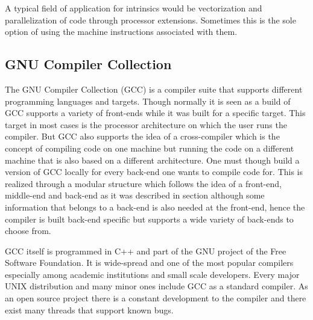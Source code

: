 A typical field of application for intrinsics would be vectorization and parallelization of code through processor extensions.
Sometimes this is the sole option of using the machine instructions associated with them.

\subsection{GNU Compiler Collection}
The GNU Compiler Collection (GCC) is a compiler suite that supports different programming languages and targets.
Though normally it is seen as a build of GCC supports a variety of front-ends while it was built for a specific target.
This target in most cases is the processor architecture on which the user runs the compiler.
But GCC also supports the idea of a cross-compiler which is the concept of compiling code on one machine but running the code on a different machine that is also based on a different architecture.
One must though build a version of GCC locally for every back-end one wants to compile code for.
This is realized through a modular structure which follows the idea of a front-end, middle-end and back-end as it was described in section  although some information that belongs to a back-end is also needed at the front-end, hence the compiler is built back-end specific but supports a wide variety of back-ends to choose from.

GCC itself is programmed in C++ and part of the GNU project of the Free Software Foundation.
It is wide-spread and one of the most popular compilers especially among academic institutions and small scale developers.
Every major UNIX distribution and many minor ones include GCC as a standard compiler.
As an open source project there is a constant development to the compiler and there exist many threads that support known bugs.

